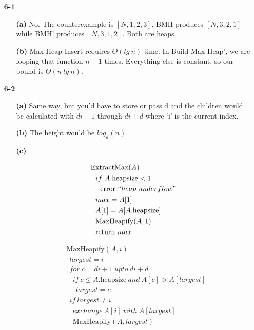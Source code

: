 \documentclass{article}
\begin{document}
\begin{enumerate}
\item[\textbf{6-1}]

	\begin{enumerate}

	\item[\textbf{(a)}]
	No. The counterexample is $[N,1,2,3]$. BMH produces $[N,3,2,1]$ while BMH' produces $[N,3,1,2]$. Both are heaps.

	\item[\textbf{(b)}]
	Max-Heap-Insert requires $\Theta(lg\ n)$ time. In Build-Max-Heap', we are
	looping that function $n-1$ times. Everything else is constant, so our bound is
	$\Theta(n\ lg\ n)$.

	\end{enumerate}

\item[\textbf{6-2}]


	\begin{enumerate}

	\item[\textbf{(a)}]
	Same way, but you'd have to store or pass d and the children would be
	calculated with $di + 1$ through $di+d$ where `i' is the current index.

	\item[\textbf{(b)}]
	The height would be $log_d(n)$.

	\item[\textbf{(c)}]
	
	\begin{align*}
	& \text{ExtractMax}(A) \\
	& \ \ if\ A.\text{heapsize} < 1 \\
	& \ \ \ \ \text{error}\ ``heap\ underflow" \\
	& \ \ max = A[1] \\
	& \ \ A[1] = A[A.\text{heapsize}] \\
	& \ \ \text{MaxHeapify}(A,1) \\
	& \ \ \text{return}\ max
	\end{align*}
	
	\begin{align*}
	& \text{MaxHeapify}(A,i) \\
	& \ \ largest = i \\
	& \ \ for\ c = di + 1\ upto\ di + d \\
	& \ \ \ \ if\ c \leq A.\text{heapsize}\ and\ A[c] > A[largest] \\
	& \ \ \ \ \ \ largest = c \\
	& \ \ if\ largest \neq i \\
	& \ \ \ \ exchange\ A[i]\ with\ A[largest] \\
	& \ \ \ \ \text{MaxHeapify}(A,largest) 
	\end{align*}


\end{enumerate}
\end{enumerate}
\end{document}
